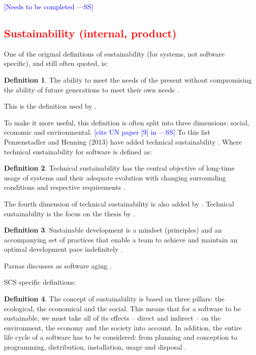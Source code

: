 \documentclass[letterpaper, cleveref]{lipics-v2019}
\newcommand{\authornote}[3]{\textcolor{#1}{[#3 ---#2]}}
\newcommand{\authornote}[3]{}
\newcommand{\wss}[1]{\authornote{blue}{SS}{#1}} %
\newcommand{\notdone}[1]{\textcolor{red}{#1}}
\theoremstyle{definition}
\newtheorem{defn}{Definition}
\begin{document}
\wss{Needs to be completed}


\subsection{\notdone{Sustainability (internal, product)}} %

One of the original definitions of sustainability (for systems, not software
specific), and still often quoted, is:

\begin{defn}
  \noindent The ability to meet the needs of the present without
  compromising the ability of future generations to meet their own needs
  \citep{Brundtland1987}.
\end{defn}

This is the definition used by \citet{IISD2019}.

To make it more useful, this definition is often split into three dimensions:
social, economic and environmental. \wss{cite UN paper [9] in
  \citet{PenzenstadlerAndHenning2013}} To this list Penzenstadler and Henning
(2013) have added technical sustainability \citep{PenzenstadlerAndHenning2013}.
Where technical sustainability for software is defined as:

\begin{defn}
  \noindent Technical sustainability has the central objective of long-time
  usage of systems and their adequate evolution with changing surrounding
  conditions and respective requirements \citep{PenzenstadlerAndHenning2013}.
\end{defn}

The fourth dimension of technical sustainability is also added by
\citep{WolframEtAl2017}.  Technical sustainability is the focus on the
thesis by \citet{Hygerth2016}.

\begin{defn}
  \noindent Sustainable development is a mindset (principles) and an
  accompanying set of practices that enable a team to achieve and maintain
  an optimal development pace indefinitely \citep{Tate2005}.
\end{defn}

Parnas discusses as software aging \citep{Parnas1994a}.

SCS specific definitions:

\begin{defn}
  The concept of sustainability is based on three pillars: the ecological, the
  economical and the social. This means that for a software to be sustainable,
  we must take all of its effects -- direct and indirect -- on the environment,
  the economy and the society into account. In addition, the entire life cycle
  of a software has to be considered: from planning and conception to
  programming, distribution, installation, usage and disposal \citep{Heine2017}.
\end{defn}
\end{document}
